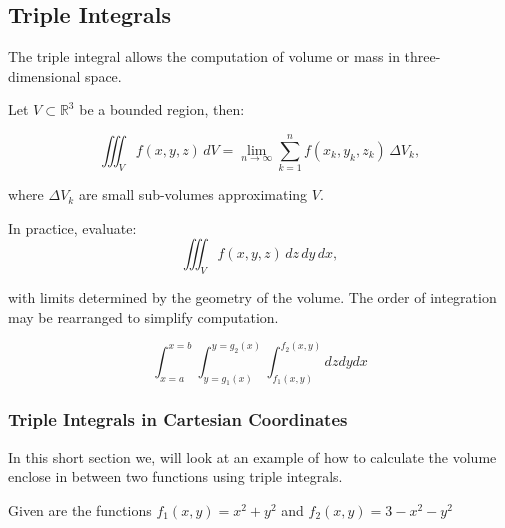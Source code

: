 \QED

\subsection{Triple Integrals}

The triple integral allows the computation of volume or mass in three-dimensional space.

Let \( V \subset \mathbb{R}^3 \) be a bounded region, then:

\[
\iiint_V f(x, y, z)\, dV = \lim_{n \to \infty} \sum_{k=1}^n f(x_k, y_k, z_k) \, \Delta V_k,
\]

where \( \Delta V_k \) are small sub-volumes approximating \( V \).

In practice, evaluate:
\[
\iiint_V f(x, y, z)\, dz\, dy\, dx,
\]

with limits determined by the geometry of the volume. The order of integration may be rearranged to simplify computation.

\[
\int_{x=a}^{x=b}\int_{y=g_1(x)}^{y=g_2(x)} \int_{f_1(x,y)}^{f_2(x,y)} dz dy dx
\]

\subsubsection{Triple Integrals in Cartesian Coordinates}

In this short section we, will look at an example of how to calculate the volume enclose in
between two functions using triple integrals.

Given are the functions \(f_1(x,y) = x^2 + y^2\) and \(f_2(x,y) = 3 - x^2 - y^2\)


\begin{center}
    
\end{center}

